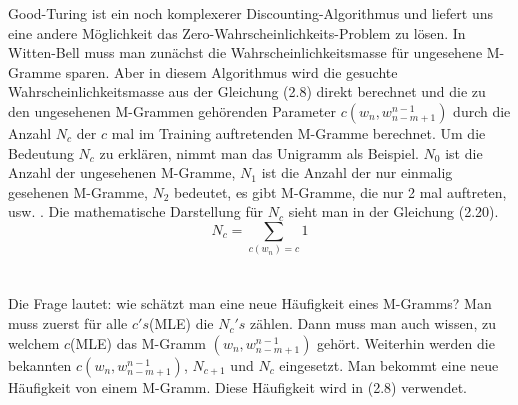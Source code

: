 Good-Turing ist ein noch komplexerer Discounting-Algorithmus und liefert uns eine andere M\"oglichkeit  das Zero-Wahrscheinlichkeits-Problem zu l\"osen. In Witten-Bell muss man zun\"achst die Wahrscheinlichkeitsmasse f\"ur ungesehene M-Gramme sparen. Aber in diesem Algorithmus wird die gesuchte Wahrscheinlichkeitsmasse aus der Gleichung (2.8) direkt berechnet und die zu den ungesehenen M-Grammen geh\"orenden Parameter $c(w_{n},w_{n-m+1}^{n-1})$ durch die Anzahl $N_{c}$ der  $c$ mal im Training auftretenden M-Gramme berechnet. Um die Bedeutung $N_{c}$ zu erkl\"aren, nimmt man das Unigramm als Beispiel. $N_{0}$ ist die Anzahl der ungesehenen M-Gramme, $N_{1}$ ist die Anzahl der nur einmalig gesehenen M-Gramme, $N_{2}$ bedeutet, es gibt  M-Gramme, die nur 2 mal auftreten, usw. . Die mathematische Darstellung f\"ur $N_{c}$ sieht man in der Gleichung (2.20).
\begin{equation}
N_{c}=\sum_{c(w_{n})=c}1
\end{equation}
\\
\\
Die Frage lautet: wie sch\"atzt man eine neue H\"aufigkeit eines M-Gramms? Man muss zuerst f\"ur alle $c's$(MLE) die $N_{c}'s$ z\"ahlen. Dann muss man auch wissen, zu welchem $c$(MLE) das M-Gramm $(w_{n},w_{n-m+1}^{n-1})$  geh\"ort. Weiterhin werden die bekannten $c(w_{n},w_{n-m+1}^{n-1})$, $N_{c+1}$ und $N_{c}$ eingesetzt. Man bekommt eine neue H\"aufigkeit von einem M-Gramm. Diese H\"aufigkeit wird in (2.8) verwendet.

